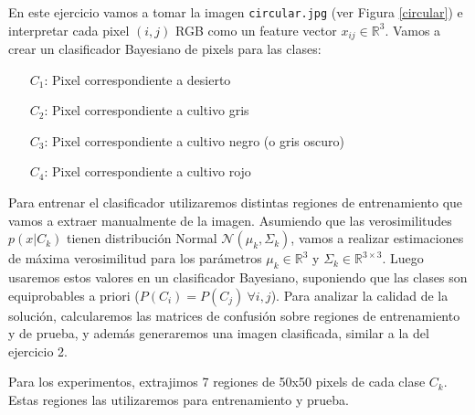 \documentclass[a4paper,11pt]{article}
\newcommand{\real}{\mathds{R}}
\begin{document}
En este ejercicio vamos a tomar la imagen {\tt circular.jpg} (ver Figura \ref{circular}) e interpretar cada pixel $(i,j)$ RGB como un feature vector $x_{ij}\in\real^3$.
Vamos a crear un clasificador Bayesiano de pixels para las clases:
\begin{enumerate}
  \item[$C_1$:] Pixel correspondiente a desierto
  \item[$C_2$:] Pixel correspondiente a cultivo gris
  \item[$C_3$:] Pixel correspondiente a cultivo negro (o gris oscuro)
  \item[$C_4$:] Pixel correspondiente a cultivo rojo
\end{enumerate}
Para entrenar el clasificador utilizaremos distintas regiones de entrenamiento que vamos a extraer manualmente de la imagen. Asumiendo que las verosimilitudes $p(x|C_k)$ tienen distribución Normal $\mathcal{N}(\mu_k, \Sigma_k)$, vamos a realizar estimaciones de máxima verosimilitud para los parámetros $\mu_k \in\real^3$ y $\Sigma_k\in\real^{3\times 3}$. Luego usaremos estos valores en un clasificador Bayesiano,
suponiendo que las clases son equiprobables a priori ($P(C_i) = P(C_j) \ \forall i,j$). 
Para analizar la calidad de la solución, calcularemos las matrices de confusión sobre regiones de entrenamiento y de prueba, y además generaremos una imagen clasificada, similar a la del ejercicio 2.

Para los experimentos, extrajimos 7 regiones de 50x50 pixels de cada clase $C_k$. Estas regiones las utilizaremos para entrenamiento y prueba.
\end{document}

